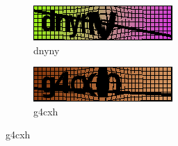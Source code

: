\begin{figure}[ht]
	\begin{subfigure}{.5\textwidth}
		\centering
		\includegraphics[width=.9\linewidth]{figuras/12248_dnyny.png}
		\caption{dnyny}
	\end{subfigure}
	\begin{subfigure}{.5\textwidth}
		\centering
		\includegraphics[width=.9\linewidth]{figuras/8873_g4cxh.png}
		\caption{g4cxh}
	\end{subfigure}%
	\vspace{.05\linewidth}
\end{figure}

